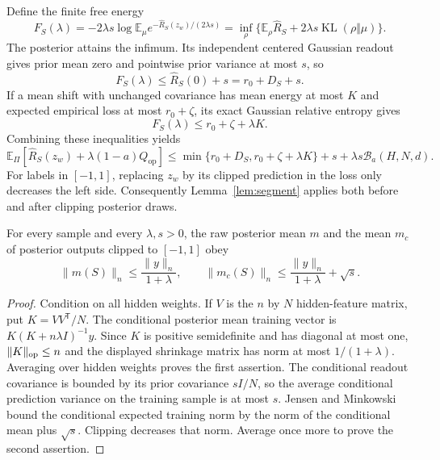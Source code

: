 Define the finite free energy
\[
 F_S(\lambda)=-2\lambda s\log\mathbb E_\mu
       e^{-\widehat R_S(z_w)/(2\lambda s)}
 =\inf_\rho\{\mathbb E_\rho\widehat R_S+2\lambda s\operatorname{KL}(\rho\Vert\mu)\}.
\]
The posterior attains the infimum. Its independent centered Gaussian readout gives prior mean zero and pointwise prior variance at most $s$, so
\begin{equation}
 F_S(\lambda)\le\widehat R_S(0)+s=r_0+D_S+s.
 \label{eq:zero-comparison}
\end{equation}
If a mean shift with unchanged covariance has mean energy at most $K$ and expected empirical loss at most $r_0+\zeta$, its exact Gaussian relative entropy gives
\begin{equation}
 F_S(\lambda)\le r_0+\zeta+\lambda K.
 \label{eq:memo-comparison}
\end{equation}
Combining these inequalities yields
\begin{equation}
 \mathbb E_\Pi[\widehat R_S(z_w)+\lambda(1-a)Q_{\mathrm{op}}]
 \le\min\{r_0+D_S,r_0+\zeta+\lambda K\}
       +s+\lambda s\mathcal B_a(H,N,d).
 \label{eq:finite-objective}
\end{equation}
For labels in $[-1,1]$, replacing $z_w$ by its clipped prediction in the loss only decreases the left side. Consequently Lemma~\ref{lem:segment} applies both before and after clipping posterior draws.

\begin{lemma}
\label{lem:large-temperature}
For every sample and every $\lambda,s>0$, the raw posterior mean $m$ and the mean $m_c$ of posterior outputs clipped to $[-1,1]$ obey
\[
 \|m(S)\|_n\le\frac{\|y\|_n}{1+\lambda},\qquad
 \|m_c(S)\|_n\le\frac{\|y\|_n}{1+\lambda}+\sqrt s.
\]
\end{lemma}
\begin{proof}
Condition on all hidden weights. If $V$ is the $n$ by $N$ hidden-feature matrix, put $K=VV^{\mathsf T}/N$. The conditional posterior mean training vector is
$K(K+n\lambda I)^{-1}y$. Since $K$ is positive semidefinite and has diagonal at most one, $\|K\|_{\rm op}\le n$ and the displayed shrinkage matrix has norm at most $1/(1+\lambda)$. Averaging over hidden weights proves the first assertion.
The conditional readout covariance is bounded by its prior covariance $sI/N$, so the average conditional prediction variance on the training sample is at most $s$. Jensen and Minkowski bound the conditional expected training norm by the norm of the conditional mean plus $\sqrt s$. Clipping decreases that norm. Average once more to prove the second assertion.
\end{proof}

